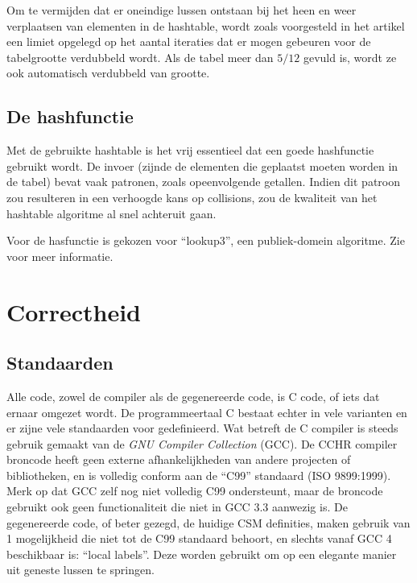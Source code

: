 Om te vermijden dat er oneindige lussen ontstaan bij het heen en weer verplaatsen van elementen in de hashtable, wordt zoals voorgesteld in het artikel een limiet opgelegd op het aantal iteraties dat er mogen gebeuren voor de tabelgrootte verdubbeld wordt. Als de tabel meer dan $5/12$ gevuld is, wordt ze ook automatisch verdubbeld van grootte.

\subsection{De hashfunctie} \label{sec:hashfunc}

Met de gebruikte hashtable is het vrij essentieel dat een goede hashfunctie gebruikt wordt. De invoer (zijnde de elementen die geplaatst moeten worden in de tabel) bevat vaak patronen, zoals opeenvolgende getallen. Indien dit patroon zou resulteren in een verhoogde kans op collisions, zou de kwaliteit van het hashtable algoritme al snel achteruit gaan.

Voor de hasfunctie is gekozen voor ``lookup3'', een publiek-domein algoritme. Zie \cite{hashing} voor meer informatie.

\section{Correctheid} \label{sec:correctheid}

\subsection{Standaarden} \label{sec:standards}

Alle code, zowel de compiler als de gegenereerde code, is C code, of iets dat ernaar omgezet wordt. De programmeertaal C bestaat echter in vele varianten en er zijne vele standaarden voor gedefinieerd. Wat betreft de C compiler is steeds gebruik gemaakt van de {\em GNU Compiler Collection} (GCC). De CCHR compiler broncode heeft geen externe afhankelijkheden van andere projecten of bibliotheken, en is volledig conform aan de ``C99'' standaard (ISO 9899:1999). Merk op dat GCC zelf nog niet volledig C99 ondersteunt, maar de broncode gebruikt ook geen functionaliteit die niet in GCC 3.3 aanwezig is. De gegenereerde code, of beter gezegd, de huidige CSM definities, maken gebruik van 1 mogelijkheid die niet tot de C99 standaard behoort, en slechts vanaf GCC 4 beschikbaar is: ``local labels''. Deze worden gebruikt om op een elegante manier uit geneste lussen te springen.

